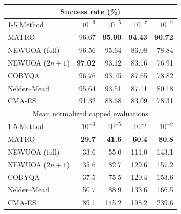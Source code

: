 \begin{tabular}{lrrrr}
\toprule
\multicolumn{5}{c}{Success rate (\%)} \\
\cmidrule(lr){1-5}
Method & $10^{-3}$ & $10^{-5}$ & $10^{-7}$ & $10^{-9}$ \\
\midrule
MATRO & 96.67 & \textbf{95.90} & \textbf{94.43} & \textbf{90.72} \\
NEWUOA (full) & 96.56 & 95.64 & 86.08 & 78.84 \\
NEWUOA ($2n+1$) & \textbf{97.02} & 93.12 & 83.16 & 76.91 \\
COBYQA & 96.76 & 93.75 & 87.65 & 78.82 \\
Nelder--Mead & 95.64 & 93.51 & 87.11 & 80.18 \\
CMA-ES & 91.32 & 88.68 & 83.09 & 78.31 \\
\midrule
\multicolumn{5}{c}{Mean normalized capped evaluations} \\
\cmidrule(lr){1-5}
Method & $10^{-3}$ & $10^{-5}$ & $10^{-7}$ & $10^{-9}$ \\
\midrule
MATRO & \textbf{29.7} & \textbf{41.6} & \textbf{60.4} & \textbf{80.8} \\
NEWUOA (full) & 33.6 & 55.0 & 111.0 & 143.1 \\
NEWUOA ($2n+1$) & 35.6 & 82.7 & 129.6 & 157.2 \\
COBYQA & 37.5 & 75.5 & 120.4 & 153.6 \\
Nelder--Mead & 50.7 & 88.9 & 133.6 & 166.5 \\
CMA-ES & 89.1 & 145.2 & 198.2 & 239.6 \\
\bottomrule
\end{tabular}

